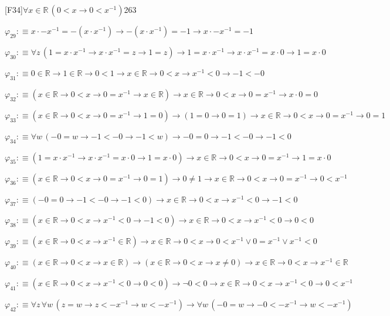 \begin{fullproof}{[F34]}{$\forall x \in \mathbb{R}\,(0 < x \to 0 < x^{-1})$}{263}
\begin{abbrevlist}
\item $\varphi_{29} :\equiv x \cdot -x^{-1} = -(x \cdot x^{-1}) \to -(x \cdot x^{-1}) = -1 \to x \cdot -x^{-1} = -1$
\item $\varphi_{30} :\equiv \forall z\,(1 = x \cdot x^{-1} \to x \cdot x^{-1} = z \to 1 = z) \to 1 = x \cdot x^{-1} \to x \cdot x^{-1} = x \cdot 0 \to 1 = x \cdot 0$
\item $\varphi_{31} :\equiv 0 \in \mathbb{R} \to 1 \in \mathbb{R} \to 0 < 1 \to x \in \mathbb{R} \to 0 < x \to x^{-1} < 0 \to -1 < -0$
\item $\varphi_{32} :\equiv (x \in \mathbb{R} \to 0 < x \to 0 = x^{-1} \to x \in \mathbb{R}) \to x \in \mathbb{R} \to 0 < x \to 0 = x^{-1} \to x \cdot 0 = 0$
\item $\varphi_{33} :\equiv (x \in \mathbb{R} \to 0 < x \to 0 = x^{-1} \to 1 = 0) \to (1 = 0 \to 0 = 1) \to x \in \mathbb{R} \to 0 < x \to 0 = x^{-1} \to 0 = 1$
\item $\varphi_{34} :\equiv \forall w\,(-0 = w \to -1 < -0 \to -1 < w) \to -0 = 0 \to -1 < -0 \to -1 < 0$
\item $\varphi_{35} :\equiv (1 = x \cdot x^{-1} \to x \cdot x^{-1} = x \cdot 0 \to 1 = x \cdot 0) \to x \in \mathbb{R} \to 0 < x \to 0 = x^{-1} \to 1 = x \cdot 0$
\item $\varphi_{36} :\equiv (x \in \mathbb{R} \to 0 < x \to 0 = x^{-1} \to 0 = 1) \to 0 \neq 1 \to x \in \mathbb{R} \to 0 < x \to 0 = x^{-1} \to 0 < x^{-1}$
\item $\varphi_{37} :\equiv (-0 = 0 \to -1 < -0 \to -1 < 0) \to x \in \mathbb{R} \to 0 < x \to x^{-1} < 0 \to -1 < 0$
\item $\varphi_{38} :\equiv (x \in \mathbb{R} \to 0 < x \to x^{-1} < 0 \to -1 < 0) \to x \in \mathbb{R} \to 0 < x \to x^{-1} < 0 \to 0 < 0$
\item $\varphi_{39} :\equiv (x \in \mathbb{R} \to 0 < x \to x^{-1} \in \mathbb{R}) \to x \in \mathbb{R} \to 0 < x \to 0 < x^{-1} \lor 0 = x^{-1} \lor x^{-1} < 0$
\item $\varphi_{40} :\equiv (x \in \mathbb{R} \to 0 < x \to x \in \mathbb{R}) \to (x \in \mathbb{R} \to 0 < x \to x \neq 0) \to x \in \mathbb{R} \to 0 < x \to x^{-1} \in \mathbb{R}$
\item $\varphi_{41} :\equiv (x \in \mathbb{R} \to 0 < x \to x^{-1} < 0 \to 0 < 0) \to \neg 0 < 0 \to x \in \mathbb{R} \to 0 < x \to x^{-1} < 0 \to 0 < x^{-1}$
\item $\varphi_{42} :\equiv \forall z\,\forall w\,(z = w \to z < -x^{-1} \to w < -x^{-1}) \to \forall w\,(-0 = w \to -0 < -x^{-1} \to w < -x^{-1})$

\end{abbrevlist}
\end{fullproof}
